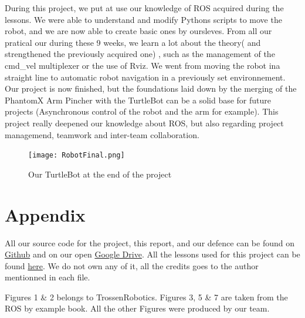 \documentclass[aps,letterpaper,11pt]{revtex4}
\begin{document}
During this project, we put at use our knowledge of ROS acquired during the lessons. We were able to understand and modify Pythons scripts to move the robot, and we are now able to create basic ones by oursleves. From all our pratical our during these 9 weeks, we learn a lot about the theory( and strengthened the previously acquired one) , such as the management of the cmd\_vel multiplexer or the use of Rviz. We went from moving the robot ina straight line to automatic robot navigation in a previously set environnement. Our project is now finished, but the foundations laid down by the merging of the PhantomX Arm Pincher with the TurtleBot can be a solid base for future projects (Asynchronous control of the robot and the arm for example). This project really deepened our knowledge about ROS, but also regarding project managemend, teamwork and inter-team collaboration. 
\begin{figure}[H]
	\centering
	\texttt{[image: RobotFinal.png]}
	\caption{Our TurtleBot at the end of the project}
	\label{fig: fiianl}    
\end{figure} 
\section{Appendix}
All our source code for the project, this report, and our defence can be found on \href{https://github.com/AntoineMerlet/Robotics}{Github} and on our open \href{https://drive.google.com/open?id=0B8c8pooKt7IPRXBxaTRpV3JIWFU}{Google Drive}.
All the lessons used for this project can be found \href{https://drive.google.com/open?id=0B8c8pooKt7IPTnRKSmtnVlMtTHc}{here}. We do not own any of it, all the credits goes to the author mentionned in each file.

Figures 1 \& 2 belongs to TrossenRobotics.
Figures 3, 5 \& 7 are taken from the ROS by example book.
All the other Figures were produced by our team.
\end{document}

